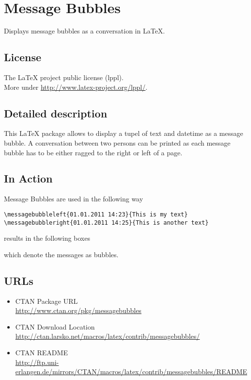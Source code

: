 \documentclass{article}
\begin{document}
\section{Message Bubbles}

Displays message bubbles as a conversation in LaTeX.

\subsection{License}

The LaTeX project public license (lppl). \\More under \url{http://www.latex-project.org/lppl/}. 

\subsection{Detailed description}

This LaTeX package allows to display a tupel of text and datetime as a message
bubble. A conversation between two persons can be printed as each message bubble
has to be either ragged to the right or left of a page.

\subsection{In Action}

Message Bubbles are used in the following way

\begin{verbatim}
\messagebubbleleft{01.01.2011 14:23}{This is my text}
\messagebubbleright{01.01.2011 14:25}{This is another text}
\end{verbatim}

results in the following boxes


which denote the messages as bubbles. 

\subsection{URLs}

\begin{itemize}
	\item CTAN Package URL\\\url{http://www.ctan.org/pkg/messagebubbles}
	\item CTAN Download Location\\\url{http://ctan.larsko.net/macros/latex/contrib/messagebubbles/}
	\item CTAN README\\\url{http://ftp.uni-erlangen.de/mirrors/CTAN/macros/latex/contrib/messagebubbles/README}
\end{itemize}
\end{document}

